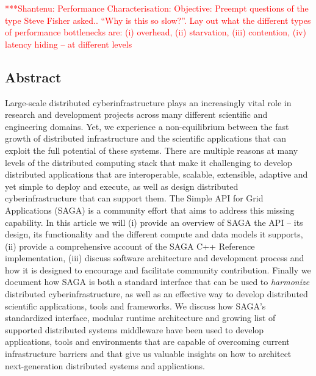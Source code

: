 \documentclass[a4paper,10pt]{article}
\newcommand{\jhanote}[1]{  {\textcolor{red}     { ***Shantenu: #1 }}}
\newcommand{\jhanote}[1]{}
\begin{document}
\jhanote{Performance Characterisation: Objective: Preempt questions of
  the type Steve Fisher asked.. ``Why is this so slow?''. Lay out what
  the different types of performance bottlenecks are: (i) overhead,
  (ii) starvation, (iii) contention, (iv) latency hiding -- at
  different levels}


\newpage 

\subsection*{Abstract}

Large-scale distributed cyberinfrastructure plays an increasingly vital
role in research and development projects across many different
scientific and engineering domains. Yet, we experience a
non-equilibrium between the fast growth of distributed infrastructure
and the scientific applications that can exploit the full potential of
these systems. There are multiple reasons at many levels of the
distributed computing stack that make it challenging to develop
distributed applications that are interoperable, scalable, extensible,
adaptive and yet simple to deploy and execute, as well as design
distributed cyberinfrastructure that can support them.  The Simple API
for Grid Applications (SAGA) is a community effort that aims to
address this missing capability.  In this article we will (i) provide
an overview of SAGA the API -- its design, its functionality and the
different compute and data models it supports, (ii) provide a
comprehensive account of the SAGA C++ Reference implementation, (iii)
discuss software architecture and development process and how it is
designed to encourage and facilitate community contribution.  Finally
we document how SAGA is both a standard interface that can be used to
{\it harmonize} distributed cyberinfrastructure, as well as an
effective way to develop distributed scientific applications, tools
and frameworks.  We discuss how SAGA's standardized interface, modular
runtime architecture and growing list of supported distributed systems
middleware have been used to develop applications, tools and
environments that are capable of overcoming current infrastructure
barriers and that give us valuable insights on how to architect
next-generation distributed systems and applications.

\end{document}
